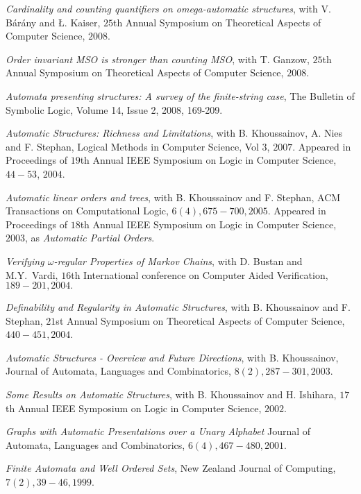 \documentclass{res}
\begin{document}
\begin{resume}
{\it Cardinality and counting quantifiers on omega-automatic structures}, with V.  B{\'a}r{\'a}ny and \L. Kaiser, 
$25$th Annual Symposium on Theoretical Aspects of Computer Science, $2008$.  

{\it Order invariant MSO is stronger than counting MSO}, with T. Ganzow, 
$25$th Annual Symposium on Theoretical Aspects of Computer Science, $2008$.  

{\it Automata presenting structures: A survey of the finite-string case}, The Bulletin of Symbolic Logic, 
Volume 14, Issue 2, 2008, 169-209.

{\it Automatic Structures: Richness and Limitations}, with B. Khoussainov, A. Nies and F. Stephan, 
Logical Methods in Computer Science, Vol $3$, $2007$. Appeared in Proceedings of 
$19$th Annual {IEEE} Symposium on Logic in Computer Science, $44-53$, $2004$. 

{\it Automatic linear orders and trees}, with B. Khoussainov and F. Stephan, 
ACM Transactions on Computational Logic,
$6 (4), 675-700, 2005$. Appeared in 
Proceedings of $18$th Annual IEEE Symposium on Logic in Computer Science, $2003$,
as {\it Automatic Partial Orders}.  

{\it Verifying $\omega$-regular Properties of Markov Chains}, with D. Bustan and
M.Y.~Vardi, $16$th International conference on Computer Aided Verification,
$189-201, 2004.$ 

 
{\it Definability and Regularity in Automatic Structures}, with B. Khoussainov
and F. Stephan, $21$st Annual Symposium on Theoretical Aspects of 
Computer Science, $440-451, 2004$.  
 
{\it Automatic Structures - Overview and Future Directions}, with 
B. Khoussainov,
Journal of Automata, Languages and Combinatorics, $8(2), 287-301, 2003$. 

{\it Some Results on Automatic Structures}, with B. Khoussainov
and H. Ishihara, $17$th Annual IEEE Symposium on Logic in Computer Science,
$2002$. 

{\it Graphs with Automatic Presentations over a Unary Alphabet}
Journal of Automata, Languages and Combinatorics, $6(4), 467-480, 2001$. 

{\it Finite Automata and Well Ordered Sets},
New Zealand Journal of Computing, $7(2), 39-46, 1999$. 
 
\end{resume}
\end{document}
